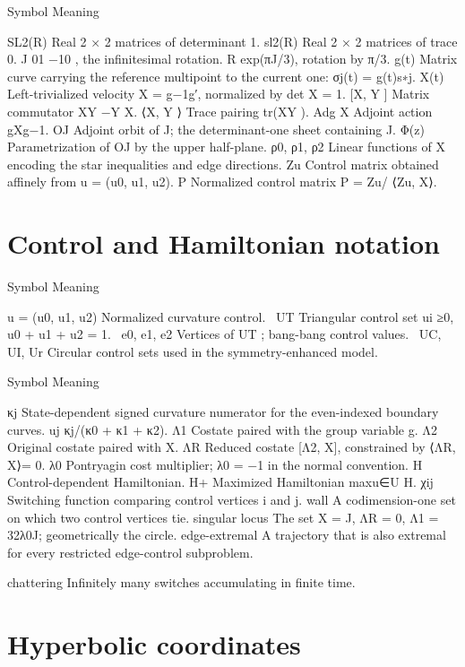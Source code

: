 Symbol Meaning


SL2(R) Real 2 × 2 matrices of determinant 1. sl2(R) Real 2 × 2 matrices of trace 0. J 01 −10 , the infinitesimal rotation. R exp(πJ/3), rotation by π/3. g(t) Matrix curve carrying the reference multipoint to the current one: σj(t) = g(t)s∗j. X(t) Left-trivialized velocity X = g−1g′, normalized by det X = 1. [X, Y ] Matrix commutator XY −Y X. ⟨X, Y ⟩ Trace pairing tr(XY ). Adg X Adjoint action gXg−1. OJ Adjoint orbit of J; the determinant-one sheet containing J. Φ(z) Parametrization of OJ by the upper half-plane. ρ0, ρ1, ρ2 Linear functions of X encoding the star inequalities and edge directions. Zu Control matrix obtained affinely from u = (u0, u1, u2). P Normalized control matrix P = Zu/ ⟨Zu, X⟩.


\section{Control and Hamiltonian notation}

Symbol Meaning


\begin{displaytext}
u = (u0, u1, u2) Normalized curvature control. \
UT Triangular control set ui ≥0, u0 + u1 + u2 = 1. \
e0, e1, e2 Vertices of UT ; bang-bang control values. \
UC, UI, Ur Circular control sets used in the symmetry-enhanced model.
\end{displaytext}

Symbol Meaning


κj State-dependent signed curvature numerator for the even-indexed boundary curves. uj κj/(κ0 + κ1 + κ2). Λ1 Costate paired with the group variable g. Λ2 Original costate paired with X. ΛR Reduced costate [Λ2, X], constrained by ⟨ΛR, X⟩= 0. λ0 Pontryagin cost multiplier; λ0 = −1 in the normal convention. H Control-dependent Hamiltonian. H+ Maximized Hamiltonian maxu∈U H. χij Switching function comparing control vertices i and j. wall A codimension-one set on which two control vertices tie. singular locus The set X = J, ΛR = 0, Λ1 = 32λ0J; geometrically the circle. edge-extremal A trajectory that is also extremal for every restricted edge-control subproblem.


chattering Infinitely many switches accumulating in finite time.


\section{Hyperbolic coordinates}

